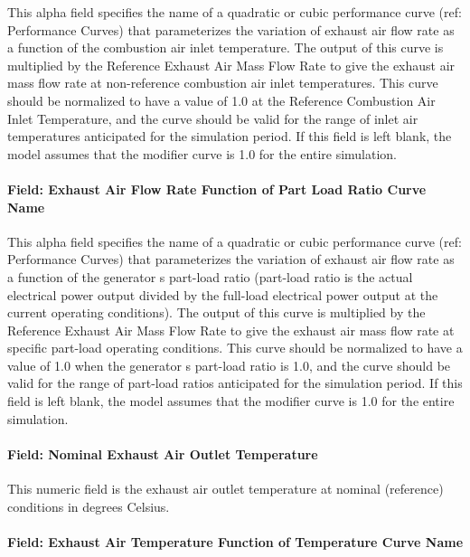 This alpha field specifies the name of a quadratic or cubic performance curve (ref: Performance Curves) that parameterizes the variation of exhaust air flow rate as a function of the combustion air inlet temperature. The output of this curve is multiplied by the Reference Exhaust Air Mass Flow Rate to give the exhaust air mass flow rate at non-reference combustion air inlet temperatures. This curve should be normalized to have a value of 1.0 at the Reference Combustion Air Inlet Temperature, and the curve should be valid for the range of inlet air temperatures anticipated for the simulation period. If this field is left blank, the model assumes that the modifier curve is 1.0 for the entire simulation.

\paragraph{Field: Exhaust Air Flow Rate Function of Part Load Ratio Curve Name}\label{field-exhaust-air-flow-rate-function-of-part-load-ratio-curve-name}

This alpha field specifies the name of a quadratic or cubic performance curve (ref: Performance Curves) that parameterizes the variation of exhaust air flow rate as a function of the generator s part-load ratio (part-load ratio is the actual electrical power output divided by the full-load electrical power output at the current operating conditions). The output of this curve is multiplied by the Reference Exhaust Air Mass Flow Rate to give the exhaust air mass flow rate at specific part-load operating conditions. This curve should be normalized to have a value of 1.0 when the generator s part-load ratio is 1.0, and the curve should be valid for the range of part-load ratios anticipated for the simulation period. If this field is left blank, the model assumes that the modifier curve is 1.0 for the entire simulation.

\paragraph{Field: Nominal Exhaust Air Outlet Temperature}\label{field-nominal-exhaust-air-outlet-temperature}

This numeric field is the exhaust air outlet temperature at nominal (reference) conditions in degrees Celsius.

\paragraph{Field: Exhaust Air Temperature Function of Temperature Curve Name}\label{field-exhaust-air-temperature-function-of-temperature-curve-name}

